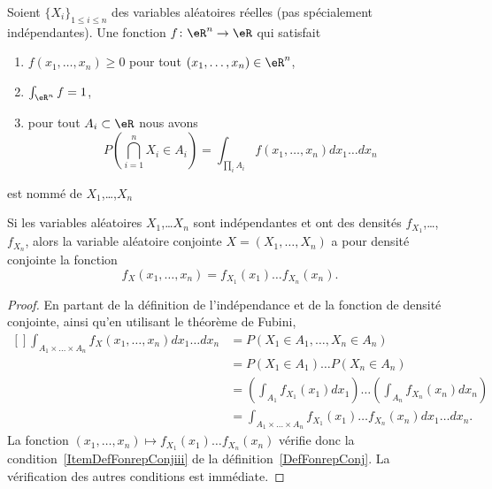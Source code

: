 \begin{definition}      \label{DefFonrepConj}
	Soient \( \{ X_i \}_{1\leq i\leq n}\) des variables aléatoires réelles (pas spécialement indépendantes). Une fonction \( f\colon \eR^n\to \eR\) qui satisfait
	\begin{enumerate}
		\item
		      \( f(x_1,\ldots,x_n)\geq 0\) pour tout \( (x_1,\ldots,x_n)\in\eR^n\),
		\item
		      \( \int_{\eR^n}f=1\),
		\item       \label{ItemDefFonrepConjiii}
		      pour tout \( A_i\subset\eR \) nous avons
		      \begin{equation}
			      P(\bigcap_{i=1}^n X_i\in A_i)=\int_{\prod_i A_i}f(x_1,\ldots,x_n)dx_1\ldots dx_n
		      \end{equation}
	\end{enumerate}
    est nommé  de \( X_1\),\ldots,\( X_n\)
\end{definition}

\begin{proposition}     \label{PropDensiteConjIndep}
	Si les variables aléatoires \( X_1\),\ldots \( X_n\) sont indépendantes et ont des densités \( f_{X_1}\),\ldots,\( f_{X_n}\), alors la variable aléatoire conjointe \( X=(X_1,\ldots,X_n)\) a pour densité conjointe la fonction
	\begin{equation}
		f_X(x_1,\ldots,x_n)=f_{X_1}(x_1)\ldots f_{X_n}(x_n).
	\end{equation}
\end{proposition}

\begin{proof}
	En partant de la définition de l'indépendance et de la fonction de densité conjointe, ainsi qu'en utilisant le théorème de Fubini,
	\begin{equation}
		\begin{aligned}[]
			\int_{A_1\times \ldots\times A_n}f_X(x_1,\ldots,x_n)dx_1\ldots dx_n & =
			P(X_1\in A_1,\ldots,X_n\in A_n)                                                                                                                                 \\
			                                                                    & =P(X_1\in A_1)\ldots P(X_n\in A_n)                                                        \\
			                                                                    & =\left( \int_{A_1}f_{X_1}(x_1)dx_1 \right)\ldots\left( \int_{A_n}f_{X_n}(x_n)dx_n \right) \\
			                                                                    & =\int_{A_1\times\ldots\times A_n}f_{X_1}(x_1)\ldots f_{X_n}(x_n)dx_1\ldots dx_n.
		\end{aligned}
	\end{equation}
	La fonction \( (x_1,\ldots,x_n)\mapsto f_{X_1}(x_1)\ldots f_{X_n}(x_n)\) vérifie donc la condition~\ref{ItemDefFonrepConjiii} de la définition~\ref{DefFonrepConj}. La vérification des autres conditions est immédiate.
\end{proof}


